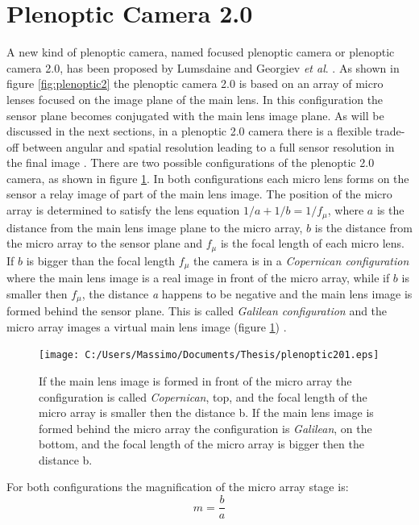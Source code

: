  \section{Plenoptic Camera 2.0}
 \label{sec:pleno20}
 A new kind of plenoptic camera, named focused plenoptic camera or plenoptic camera 2.0, has been proposed by Lumsdaine and Georgiev \textit{et al}. \cite{lumsdaine2008full,lumsdaine2009focused}. As shown in figure \ref{fig:plenoptic2} the plenoptic camera 2.0 is based on an array of micro lenses focused on the image plane of the main lens. In this configuration the sensor plane becomes conjugated with the main lens image plane. As will be discussed in the next sections, in a plenoptic 2.0 camera there is a flexible trade-off between angular and spatial resolution \cite{georgiev2010focused} leading to a full sensor resolution in the final image \cite{bishop2011full,georgiev2009resolution}. There are two possible configurations of the plenoptic 2.0 camera, as shown in figure \ref{fig:pleno201}. In both configurations each micro lens forms on the sensor a relay image of part of the main lens image. The position of the micro array is determined to satisfy the lens equation $1/a+1/b=1/f_{\mu}$, where $a$ is the distance from the main lens image plane to the micro array, $b$ is the distance from the micro array to the sensor plane and $f_{\mu}$ is the focal length of each micro lens. If $b$ is bigger than the focal length $f_{\mu}$ the camera is in a \textit{Copernican configuration} where the main lens image is a real image in front of the micro array, while if $b$ is smaller then $f_{\mu}$, the distance \textit{a} happens to be negative and the main lens image is formed behind the sensor plane. This is called \textit{Galilean configuration} and the micro array images a virtual main lens image (figure \ref{fig:pleno201}) \cite{georgiev2010focused}. 
 \begin{figure}[H]
 	\centering
 	\texttt{[image: C:/Users/Massimo/Documents/Thesis/plenoptic201.eps]}
 	\caption{\label{fig:pleno201} If the main lens image is formed in front of the micro array the configuration is called \textit{Copernican}, top, and the focal length of the micro array is smaller then the distance b. If the main lens image is formed behind the micro array the configuration is \textit{Galilean}, on the bottom, and the focal length of the micro array is bigger then the distance b. }
 \end{figure}
 For both configurations the magnification of the micro array stage is:
 \begin{equation}
 \label{eq:pleno20}
 m=\dfrac{b}{a}
 \end{equation}
